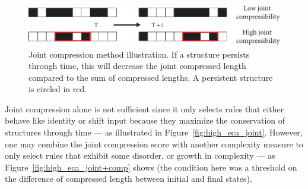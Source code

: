 \begin{figure}[htbp]
  \centering
  \includegraphics[width=\linewidth]{figures/joint_comp_1d}
  \caption{Joint compression method illustration. If a structure persists
    through time, this will decrease the joint compressed length compared to the
    sum of compressed lengths. A persistent structure is circled in red.}
  \label{fig:joint_schema}
\end{figure}

Joint compression alone is not sufficient since it only selects rules that
either behave like identity or shift input because they maximize the
conservation of structures through time --- as illustrated in
Figure~\ref{fig:high_eca_joint}. However, one may combine the joint compression
score with another complexity measure to only select rules that exhibit some
disorder, or growth in complexity --- as Figure~\ref{fig:high_eca_joint+comp}
shows (the condition here was a threshold on the difference of compressed length
between initial and final states).

